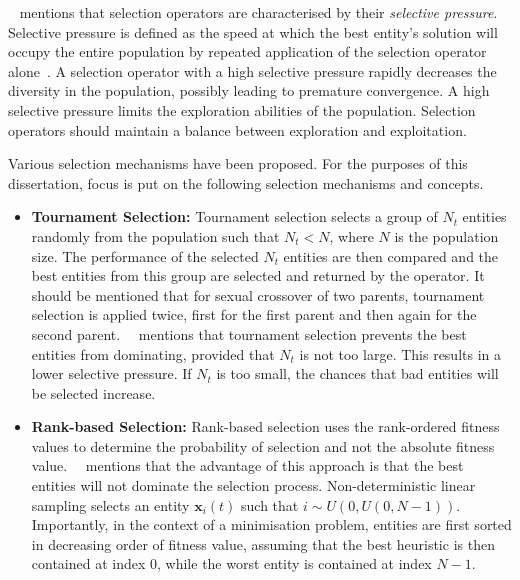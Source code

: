 {\citeauthor{ref:engelbrecht:2007}~\cite{ref:engelbrecht:2007} mentions that selection operators are characterised by their \textit{selective pressure}. Selective pressure is defined as the speed at which the best entity's solution will occupy the entire population by repeated application of the selection operator alone~\cite{ref:back:1994}. A selection operator with a high selective pressure rapidly decreases the diversity in the population, possibly leading to premature convergence. A high selective pressure limits the exploration abilities of the population. Selection operators should maintain a balance between exploration and exploitation.

Various selection mechanisms have been proposed. For the purposes of this dissertation, focus is put on the following selection mechanisms and concepts.

\begin{itemize}
	\item \textbf{Tournament Selection:} Tournament selection selects a group of $N_{t}$ entities randomly from the population such that $N_{t} < N$, where $N$ is the population size. The performance of the selected $N_{t}$ entities are then compared and the best entities from this group are selected and returned by the operator. It should be mentioned that for sexual crossover of two parents, tournament selection is applied twice, first for the first parent and then again for the second parent.~\citeauthor{ref:engelbrecht:2007}~\cite{ref:engelbrecht:2007} mentions that tournament selection prevents the best entities from dominating, provided that $N_{t}$ is not too large. This results in a lower selective pressure. If $N_{t}$ is too small, the chances that bad entities will be selected increase.

	\item \textbf{Rank-based Selection:} Rank-based selection uses the rank-ordered fitness values to determine the probability of selection and not the absolute fitness value.~\citeauthor{ref:engelbrecht:2007}~\cite{ref:engelbrecht:2007} mentions that the advantage of this approach is that the best entities will not dominate the selection process. Non-deterministic linear sampling selects an entity $\boldsymbol{x}_{i}(t)$ such that $i \sim U(0, U(0, N - 1))$. Importantly, in the context of a minimisation problem, entities are first sorted in decreasing order of fitness value, assuming that the best heuristic is then contained at index 0, while the worst entity is contained at index $N - 1$.


\end{itemize}}
